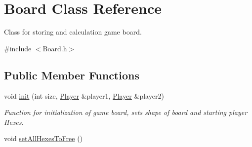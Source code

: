 \hypertarget{classBoard}{}\section{Board Class Reference}
\label{classBoard}


Class for storing and calculation game board.  




{\ttfamily \#include $<$Board.\+h$>$}

\subsection*{Public Member Functions}
\begin{DoxyCompactItemize}
\item 
void \hyperlink{classBoard_ae2db26cf7851f1571984edf4661f84e7}{init} (int size, \hyperlink{classPlayer}{Player} \&player1, \hyperlink{classPlayer}{Player} \&player2)
\begin{DoxyCompactList}\small\item\em Function for initialization of game board, sets shape of board and starting player Hexes. \end{DoxyCompactList}\item 
void \hyperlink{classBoard_ab9a3899c28b8951f7d50cdd35c3e0672}{set\+All\+Hexes\+To\+Free} ()\hypertarget{classBoard_ab9a3899c28b8951f7d50cdd35c3e0672}{}\label{classBoard_ab9a3899c28b8951f7d50cdd35c3e0672}


\end{DoxyCompactItemize}
